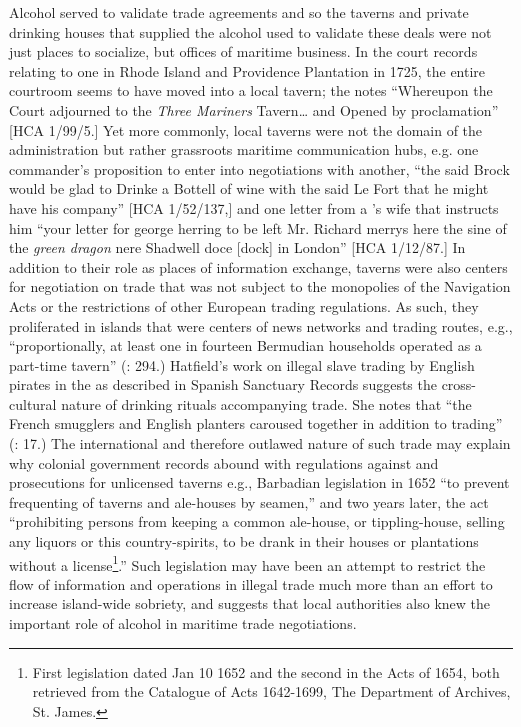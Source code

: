 Alcohol served to validate trade agreements and so the taverns and private drinking houses that supplied the alcohol used to validate these deals were not just places to socialize, but offices of maritime business. In the court records relating to one  in Rhode Island and Providence Plantation in 1725, the entire courtroom seems to have moved into a local tavern; the  notes “Whereupon the Court adjourned to the \textit{Three Mariners} Tavern… and Opened by proclamation” [HCA 1/99/5.] Yet more commonly, local taverns were not the domain of the administration but rather grassroots maritime communication hubs, e.g. one commander’s proposition to enter into negotiations with another, “the said Brock would be glad to Drinke a Bottell of wine with the said Le Fort that he might have his company” [HCA 1/52/137,] and  one letter from a ’s wife that instructs him “your letter for george herring to be left Mr. Richard merrys here the sine of the \textit{green dragon} nere Shadwell doce [dock] in London” [HCA 1/12/87.] In addition to their role as places of information exchange, taverns were also centers for negotiation on  trade that was not subject to the monopolies of the Navigation Acts or the restrictions of other European trading regulations. As such, they proliferated in islands that were centers of news networks and trading routes, e.g., “proportionally, at least one in fourteen Bermudian households operated as a part-time tavern” (\citealt{Jarvis2010}: 294.) Hatfield’s work on illegal slave trading by English pirates in the  as described in Spanish Sanctuary Records suggests the cross-cultural nature of drinking rituals accompanying trade.  She notes that “the French smugglers and English planters caroused together in addition to trading” (\citealt{Hatfield2016}: 17.) The international and therefore outlawed nature of such trade may explain why colonial government records abound with regulations against and prosecutions for unlicensed taverns e.g., Barbadian legislation in 1652 “to prevent frequenting of taverns and ale-houses by seamen,” and two years later, the act “prohibiting persons from keeping a common ale-house, or tippling-house, selling any liquors or this country-spirits, to be drank in their houses or plantations without a license\footnote{First legislation dated Jan 10 1652 and the second in the Acts of 1654, both retrieved from the Catalogue of {Acts 1642}-1699, The  Department of Archives, St. James.}.” Such legislation may have been an attempt to restrict the flow of information and operations in illegal trade much more than an effort to increase island-wide sobriety, and suggests that local authorities also knew the important role of alcohol in maritime trade negotiations. 

